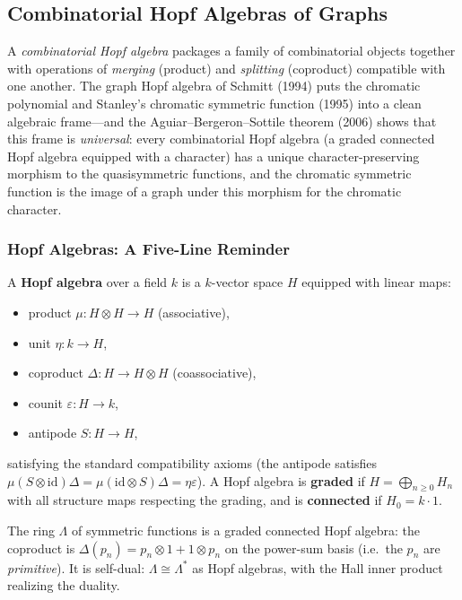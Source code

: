 \subsection{Combinatorial Hopf Algebras of Graphs}\label{subsec:hopf}

A \emph{combinatorial Hopf algebra} packages a family of combinatorial
objects together with operations of \emph{merging} (product) and
\emph{splitting} (coproduct) compatible with one another. The graph
Hopf algebra of Schmitt (1994) puts the chromatic polynomial and
Stanley's chromatic symmetric function (1995) into a clean algebraic
frame---and the
Aguiar--Bergeron--Sottile theorem (2006) shows that this frame is
\emph{universal}: every combinatorial Hopf algebra (a graded connected
Hopf algebra equipped with a character) has a unique
character-preserving morphism to the quasisymmetric functions, and the
chromatic symmetric function is the image of a graph under this
morphism for the chromatic character.

\subsubsection{Hopf Algebras: A Five-Line Reminder}

\begin{definition}\label{def:hopf}
A \textbf{Hopf algebra} over a field $k$ is a $k$-vector space $H$
equipped with linear maps:
\begin{itemize}
  \item product $\mu : H \otimes H \to H$ (associative),
  \item unit $\eta : k \to H$,
  \item coproduct $\Delta : H \to H \otimes H$ (coassociative),
  \item counit $\varepsilon : H \to k$,
  \item antipode $S : H \to H$,
\end{itemize}
satisfying the standard compatibility axioms (the antipode
satisfies $\mu(S \otimes \mathrm{id})\Delta = \mu(\mathrm{id} \otimes S)\Delta = \eta \varepsilon$).
A Hopf algebra is \textbf{graded} if $H = \bigoplus_{n \ge 0} H_n$
with all structure maps respecting the grading, and is
\textbf{connected} if $H_0 = k \cdot 1$.
\end{definition}

\begin{example}
The ring $\Lambda$ of symmetric functions is a graded connected
Hopf algebra: the coproduct is $\Delta(p_n) = p_n \otimes 1 + 1 \otimes p_n$
on the power-sum basis (i.e.\ the $p_n$ are \emph{primitive}). It is
self-dual: $\Lambda \cong \Lambda^*$ as Hopf algebras, with the Hall
inner product realizing the duality.
\end{example}

